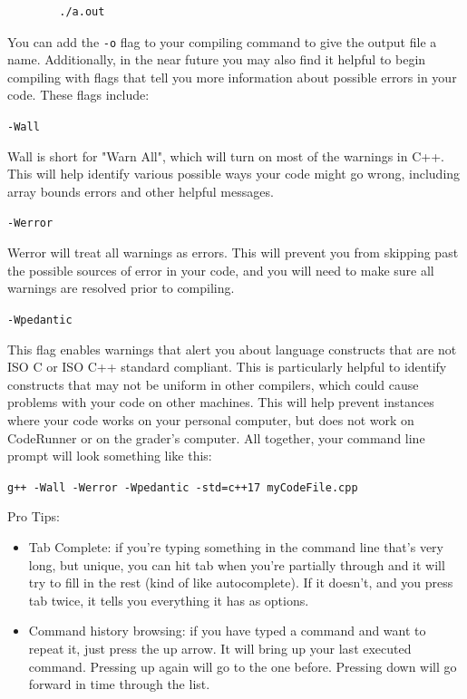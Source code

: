 \begin{verbatim}
        ./a.out
\end{verbatim}

You can add the \texttt{-o} flag to your compiling command to give the output file a name. Additionally, in the near future you may also find it helpful to begin compiling with flags that tell you more information about possible errors in your code. These flags include:

\texttt{-Wall}

Wall is short for "Warn All", which will turn on most of the warnings in C++. This will help identify various possible ways your code might go wrong, including array bounds errors and other helpful messages.

\texttt{-Werror}

Werror will treat all warnings as errors. This will prevent you from skipping past the possible sources of error in your code, and you will need to make sure all warnings are resolved prior to compiling.

\texttt{-Wpedantic}

This flag enables warnings that alert you about language constructs that are not ISO C or ISO C++ standard compliant. This is particularly helpful to identify constructs that may not be uniform in other compilers, which could cause problems with your code on other machines. This will help prevent instances where your code works on your personal computer, but does not work on CodeRunner or on the grader's computer. All together, your command line prompt will look something like this:

\texttt{g++ -Wall -Werror -Wpedantic -std=c++17 myCodeFile.cpp}

Pro Tips:
\begin{itemize}
    \item Tab Complete: if you're typing something in the command line that’s very long, but unique, you can hit tab when you're partially through and it will try to fill in the rest (kind of like autocomplete). If it doesn't, and you press tab twice, it tells you everything it has as options.
    \item Command history browsing: if you have typed a command and want to repeat it, just press the up arrow. It will bring up your last executed command. Pressing up again will go to the one before. Pressing down will go forward in time through the list.
\end{itemize}

